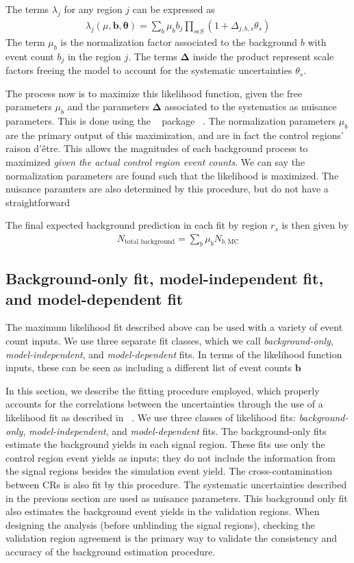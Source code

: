 The terms $\lambda_j$ for any region $j$ can be expressed as
\begin{align}
\lambda_j( \mu, \bm{b},\bm{\theta}) = \sum_b \mu_b \xspace b_j \xspace \prod_{s\epsilon S} \xspace (1 + \Delta_{j,b,s} \theta_s)
\end{align}
The term $\mu_b$ is the normalization factor associated to the background $b$ with event count $b_j$ in the region $j$.
The terms $\bm{\Delta}$ inside the product represent scale factors freeing the model to account for the systematic uncertainties $\theta_s$.

The process now is to maximize this likelihood function, given the free parameters $\mu_b$ and the parameters $\bm{\Delta}$ associated to the systematics as nuisance parameters.
This is done using the \histfitter~ package ~\cite{Baak:2014wma}.
The normalization parameters $\mu_b$ are the primary output of this maximization, and are in fact the control regions' raison d'\^{e}tre.
This allows the magnitudes of each background process to maximized \textit{given the actual control region event counts}.
We can say the normalization parameters are found such that the likelihood is maximized.
The nuisance paramters are also determined by this procedure, but do not have a straightforward

The final expected background prediction in each fit by region $r_s$ is then given by
\begin{align}
N_{\text{total background}} = \sum_b \mu_b N_{b, \text{MC}}
\end{align}

\subsection{Background-only fit, model-independent fit, and model-dependent fit}

The maximum likelihood fit described above can be used with a variety of event count inputs.
We use three separate fit classes, which we call \textit{background-only}, \textit{model-independent}, and \textit{model-dependent} fits.
In terms of the likelihood function inputs, these can be seen as including a different list of event counts $\bm{b}$

In this section, we describe the fitting procedure employed, which properly accounts for the correlations between the uncertainties through the use of a likelihood fit as described in ~\cite{Baak:2014wma}.
We use three classes of likelihood fits: \textit{background-only}, \textit{model-independent}, and \textit{model-dependent} fits.
The background-only fits estimate the background yields in each signal region.
These fits use only the control region event yields as inputs; they do not include the information from the signal regions besides the simulation event yield.
The cross-contamination between CRs is also fit by this procedure.
The systematic uncertainties described in the previous section are used as nuisance parameters.
This background only fit also estimates the background event yields in the validation regions.
When designing the analysis (before unblinding the signal regions), checking the validation region agreement is the primary way to validate the consistency and accuracy of the background estimation procedure.


